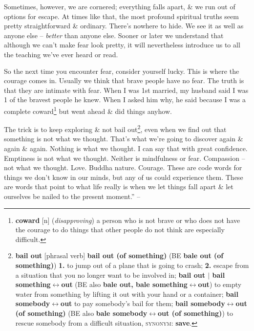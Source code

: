 \documentclass[oneside]{book}
\numberwithin{equation}{section}
\begin{document}
Sometimes, however, we are cornered; everything falls apart, \& we run out of options for escape. At times like that, the most profound spiritual truths seem pretty straightforward \& ordinary. There's nowhere to hide. We see it as well as anyone else -- \textit{better} than anyone else. Sooner or later we understand that although we can't make fear look pretty, it will nevertheless introduce us to all the teaching we've ever heard or read.

So the next time you encounter fear, consider yourself lucky. This is where the courage comes in. Usually we think that brave people have no fear. The truth is that they are intimate with fear. When I was 1st married, my husband said I was 1 of the bravest people he knew. When I asked him why, he said because I was a complete coward\footnote{\textbf{coward} [n] (\textit{disapproving}) a person who is not brave or who does not have the courage to do things that other people do not think are especially difficult.} but went ahead \& did things anyhow.

The trick is to keep exploring \& not bail out\footnote{\textbf{bail out} [phrasal verb] \textbf{bail out (of something)} (BE \textbf{bale out (of something)}) \textbf{1.} to jump out of a plane that is going to crash; \textbf{2.} escape from a situation that you no longer want to be involved in; \textbf{bail out $|$ bail something$\leftrightarrow$out} (BE also \textbf{bale out, bale something$\leftrightarrow$out}) to empty water from something by lifting it out with your hand or a container; \textbf{bail somebody$\leftrightarrow$out} to pay somebody's bail for them; \textbf{bail somebody$\leftrightarrow$out (of something)} (BE also \textbf{bale somebody$\leftrightarrow$out (of something)}) to rescue somebody from a difficult situation, \textsc{synonym}: \textbf{save}.}, even when we find out that something is not what we thought. That's what we're going to discover again \& again \& again. Nothing is what we thought. I can say that with great confidence. Emptiness is not what we thought. Neither is mindfulness or fear. Compassion -- not what we thought. Love. Buddha nature. Courage. These are code words for things we don't know in our minds, but any of us could experience them. These are words that point to what life really is when we let things fall apart \& let ourselves be nailed to the present moment.'' -- \cite[pp. 1--7]{Chodron2002}

\end{document}
